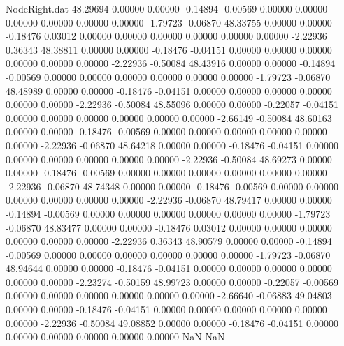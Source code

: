 \begin{filecontents}{NodeRight.dat}
  48.29694    0.00000    0.00000    -0.14894   -0.00569    0.00000    0.00000    0.00000    0.00000    0.00000    0.00000   -1.79723   -0.06870
  48.33755    0.00000    0.00000    -0.18476    0.03012    0.00000    0.00000    0.00000    0.00000    0.00000    0.00000   -2.22936    0.36343
  48.38811    0.00000    0.00000    -0.18476   -0.04151    0.00000    0.00000    0.00000    0.00000    0.00000    0.00000   -2.22936   -0.50084
  48.43916    0.00000    0.00000    -0.14894   -0.00569    0.00000    0.00000    0.00000    0.00000    0.00000    0.00000   -1.79723   -0.06870
  48.48989    0.00000    0.00000    -0.18476   -0.04151    0.00000    0.00000    0.00000    0.00000    0.00000    0.00000   -2.22936   -0.50084
  48.55096    0.00000    0.00000    -0.22057   -0.04151    0.00000    0.00000    0.00000    0.00000    0.00000    0.00000   -2.66149   -0.50084
  48.60163    0.00000    0.00000    -0.18476   -0.00569    0.00000    0.00000    0.00000    0.00000    0.00000    0.00000   -2.22936   -0.06870
  48.64218    0.00000    0.00000    -0.18476   -0.04151    0.00000    0.00000    0.00000    0.00000    0.00000    0.00000   -2.22936   -0.50084
  48.69273    0.00000    0.00000    -0.18476   -0.00569    0.00000    0.00000    0.00000    0.00000    0.00000    0.00000   -2.22936   -0.06870
  48.74348    0.00000    0.00000    -0.18476   -0.00569    0.00000    0.00000    0.00000    0.00000    0.00000    0.00000   -2.22936   -0.06870
  48.79417    0.00000    0.00000    -0.14894   -0.00569    0.00000    0.00000    0.00000    0.00000    0.00000    0.00000   -1.79723   -0.06870
  48.83477    0.00000    0.00000    -0.18476    0.03012    0.00000    0.00000    0.00000    0.00000    0.00000    0.00000   -2.22936    0.36343
  48.90579    0.00000    0.00000    -0.14894   -0.00569    0.00000    0.00000    0.00000    0.00000    0.00000    0.00000   -1.79723   -0.06870
  48.94644    0.00000    0.00000    -0.18476   -0.04151    0.00000    0.00000    0.00000    0.00000    0.00000    0.00000   -2.23274   -0.50159
  48.99723    0.00000    0.00000    -0.22057   -0.00569    0.00000    0.00000    0.00000    0.00000    0.00000    0.00000   -2.66640   -0.06883
  49.04803    0.00000    0.00000    -0.18476   -0.04151    0.00000    0.00000    0.00000    0.00000    0.00000    0.00000   -2.22936   -0.50084
  49.08852    0.00000    0.00000    -0.18476   -0.04151    0.00000    0.00000    0.00000    0.00000    0.00000    0.00000        NaN        NaN
\end{filecontents}
